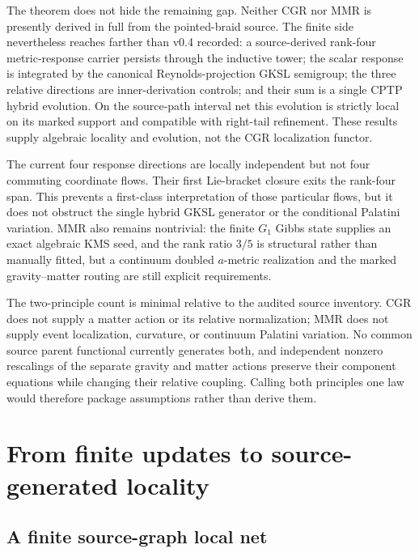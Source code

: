 \documentclass[11pt]{article}
\theoremstyle{definition}
\theoremstyle{remark}
\begin{document}
The theorem does not hide the remaining gap. Neither CGR nor MMR is presently derived in full from the pointed-braid source. The finite side nevertheless reaches farther than v0.4 recorded: a source-derived rank-four metric-response carrier persists through the inductive tower; the scalar response is integrated by the canonical Reynolds-projection GKSL semigroup; the three relative directions are inner-derivation controls; and their sum is a single CPTP hybrid evolution. On the source-path interval net this evolution is strictly local on its marked support and compatible with right-tail refinement. These results supply algebraic locality and evolution, not the CGR localization functor.

The current four response directions are locally independent but not four commuting coordinate flows. Their first Lie-bracket closure exits the rank-four span. This prevents a first-class interpretation of those particular flows, but it does not obstruct the single hybrid GKSL generator or the conditional Palatini variation. MMR also remains nontrivial: the finite $G_1$ Gibbs state supplies an exact algebraic KMS seed, and the rank ratio $3/5$ is structural rather than manually fitted, but a continuum doubled $a$-metric realization and the marked gravity--matter routing are still explicit requirements.

The two-principle count is minimal relative to the audited source inventory. CGR does not supply a matter action or its relative normalization; MMR does not supply event localization, curvature, or continuum Palatini variation. No common source parent functional currently generates both, and independent nonzero rescalings of the separate gravity and matter actions preserve their component equations while changing their relative coupling. Calling both principles one law would therefore package assumptions rather than derive them.

\section{From finite updates to source-generated locality}

\subsection{A finite source-graph local net}
\end{document}
